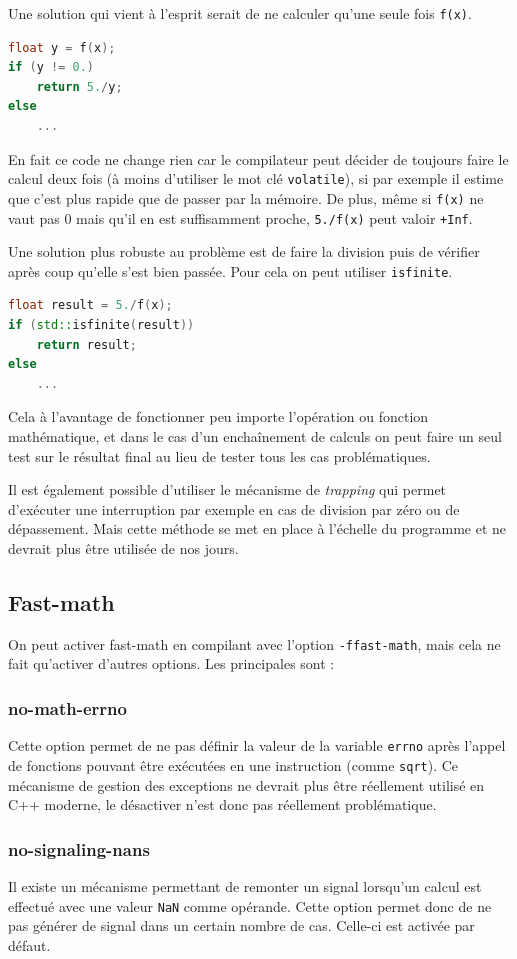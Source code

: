 \documentclass[a4paper,11pt]{report}
\begin{document}
Une solution qui vient à l'esprit serait de ne calculer qu'une seule fois \verb'f(x)'.
\begin{lstlisting}[language=c++]
float y = f(x);
if (y != 0.)
    return 5./y;
else
    ...
\end{lstlisting}
En fait ce code ne change rien car le compilateur peut décider de toujours faire le calcul deux fois (à moins d'utiliser le mot clé \verb'volatile'), si par exemple il estime que c'est plus rapide que de passer par la mémoire.
De plus, même si \verb'f(x)' ne vaut pas 0 mais qu'il en est suffisamment proche, \verb'5./f(x)' peut valoir \verb'+Inf'.

Une solution plus robuste au problème est de faire la division puis de vérifier après coup qu'elle s'est bien passée.
Pour cela on peut utiliser \verb'isfinite'.
\begin{lstlisting}[language=c++]
float result = 5./f(x);
if (std::isfinite(result))
    return result;
else
    ...
\end{lstlisting}
Cela à l'avantage de fonctionner peu importe l'opération ou fonction mathématique, et dans le cas d'un enchaînement de calculs on peut faire un seul test sur le résultat final au lieu de tester tous les cas problématiques.

Il est également possible d'utiliser le mécanisme de \emph{trapping} qui permet d'exécuter une interruption par exemple en cas de division par zéro ou de dépassement.
Mais cette méthode se met en place à l'échelle du programme et ne devrait plus être utilisée de nos jours.

\subsection{Fast-math}
On peut activer fast-math en compilant avec l'option \verb'-ffast-math', mais cela ne fait qu'activer d'autres options.
Les principales sont :

\subsubsection{no-math-errno}
Cette option permet de ne pas définir la valeur de la variable \verb'errno' après l'appel de fonctions pouvant être exécutées en une instruction (comme \verb'sqrt').
Ce mécanisme de gestion des exceptions ne devrait plus être réellement utilisé en C++ moderne, le désactiver n'est donc pas réellement problématique.

\subsubsection{no-signaling-nans}
Il existe un mécanisme permettant de remonter un signal lorsqu'un calcul est effectué avec une valeur \verb'NaN' comme opérande.
Cette option permet donc de ne pas générer de signal dans un certain nombre de cas.
Celle-ci est activée par défaut.
\end{document}
